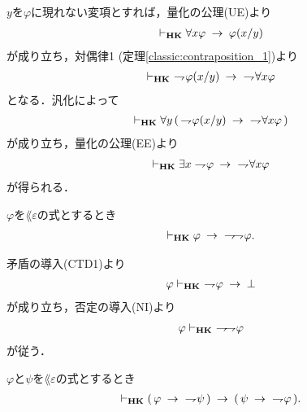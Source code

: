 	\begin{sketch}
		$y$を$\varphi$に現れない変項とすれば，量化の公理(UE)より
		\begin{align}
			\vdash_{{\scriptsize \mbox{{\bf HK}}}} \forall x \varphi \hspace{0.25em}\rightarrow\hspace{0.25em} \varphi(x/y)
		\end{align}
		が成り立ち，対偶律1 (定理\ref{classic:contraposition_1})より
		\begin{align}
			\provable{\mbox{{\bf HK}}}\ \negation \varphi(x/y) \rarrow\ \negation \forall x \varphi
		\end{align}
		となる．汎化によって
		\begin{align}
			\vdash_{{\scriptsize \mbox{{\bf HK}}}} \forall y\, (\, \rightharpoondown\hspace{-0.25em} \varphi(x/y) \hspace{0.25em}\rightarrow\hspace{0.25em}\ \rightharpoondown\hspace{-0.25em} \forall x \varphi\, )
		\end{align}
		が成り立ち，量化の公理(EE)より
		\begin{align}
			\vdash_{{\scriptsize \mbox{{\bf HK}}}} \exists x \rightharpoondown\hspace{-0.25em} \varphi \hspace{0.25em}\rightarrow\hspace{0.25em}\ \rightharpoondown\hspace{-0.25em} \forall x \varphi
		\end{align}
		が得られる．
		\QED
	\end{sketch}
	
	\begin{screen}
		\begin{thm}[二重否定の導入]
		\label{classic:introduction_of_double_negation}
			$\varphi$を$\lang{\varepsilon}$の式とするとき
			\begin{align}
				\vdash_{{\scriptsize \mbox{{\bf HK}}}} \varphi \hspace{0.25em}\rightarrow\hspace{0.25em}\ \rightharpoondown\hspace{-0.25em} \rightharpoondown\hspace{-0.25em} \varphi.
			\end{align}
		\end{thm}
	\end{screen}
	
	\begin{sketch}
		矛盾の導入(CTD1)より
		\begin{align}
			\varphi \vdash_{{\scriptsize \mbox{{\bf HK}}}}\ \rightharpoondown\hspace{-0.25em} \varphi \hspace{0.25em}\rightarrow\hspace{0.25em} \bot
		\end{align}
		が成り立ち，否定の導入(NI)より
		\begin{align}
			\varphi \vdash_{{\scriptsize \mbox{{\bf HK}}}}\ \rightharpoondown\hspace{-0.25em} \rightharpoondown\hspace{-0.25em} \varphi
		\end{align}
		が従う．
		\QED
	\end{sketch}
	
	\begin{screen}
		\begin{thm}[対偶律$2$]\label{classic:contraposition_2}
			$\varphi$と$\psi$を$\lang{\varepsilon}$の式とするとき
			\begin{align}
				\provable{\mbox{{\bf HK}}} (\, \varphi \rarrow\ \negation \psi\, )
				\rarrow (\, \psi \rarrow\ \negation \varphi\, ).
			\end{align}
		\end{thm}
	\end{screen}
	
